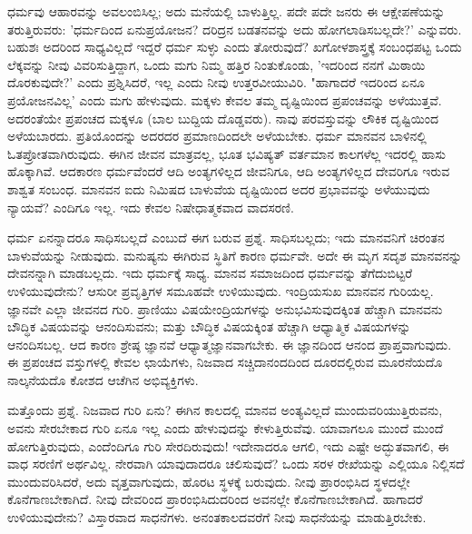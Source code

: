 ಧರ್ಮವು ಆಹಾರವನ್ನು ಅವಲಂಬಿಸಿಲ್ಲ; ಅದು ಮನೆಯಲ್ಲಿ ಬಾಳುತ್ತಿಲ್ಲ. ಪದೇ ಪದೇ ಜನರು ಈ ಆಕ್ಷೇಪಣೆಯನ್ನು ತರುತ್ತಿರುವರು: 'ಧರ್ಮದಿಂದ ಏನು\break ಪ್ರಯೋಜನ? ದರಿದ್ರನ ಬಡತನವನ್ನು ಅದು ಹೋಗಲಾಡಿಸಬಲ್ಲದೇ?' ಎನ್ನುವರು. ಬಹುಶಃ ಅದರಿಂದ ಸಾಧ್ಯವಿಲ್ಲದೆ ಇದ್ದರೆ ಧರ್ಮ ಸುಳ್ಳು ಎಂದು ತೋರುವುದೆ? ಖಗೋಳಶಾಸ್ತ್ರಕ್ಕೆ ಸಂಬಂಧಪಟ್ಟ ಒಂದು ಲೆಕ್ಕವನ್ನು ನೀವು ವಿವರಿಸುತ್ತಿದ್ದಾಗ, ಒಂದು ಮಗು ನಿಮ್ಮ ಹತ್ತಿರ ನಿಂತುಕೊಂಡು, 'ಇದರಿಂದ ನನಗೆ ಮಿಠಾಯಿ ದೊರಕುವುದೇ?' ಎಂದು ಪ್ರಶ್ನಿಸಿದರೆ, ಇಲ್ಲ ಎಂದು ನೀವು ಉತ್ತರವೀಯುವಿರಿ. "ಹಾಗಾದರೆ ಇದರಿಂದ ಏನೂ ಪ್ರಯೋಜನವಿಲ್ಲ' ಎಂದು ಮಗು ಹೇಳುವುದು. ಮಕ್ಕಳು ಕೇವಲ ತಮ್ಮ ದೃಷ್ಟಿಯಿಂದ ಪ್ರಪಂಚವನ್ನು ಅಳೆಯುತ್ತವೆ. ಅದರಂತೆಯೇ ಪ್ರಪಂಚದ ಮಕ್ಕಳೂ (ಬಾಲ ಬುದ್ದಿಯ ದೊಡ್ಡವರು). ನಾವು ಪರವಸ್ತುವನ್ನು ಲೌಕಿಕ ದೃಷ್ಟಿಯಿಂದ ಅಳೆಯಬಾರದು. ಪ್ರತಿಯೊಂದನ್ನು ಅದರದರ ಪ್ರಮಾಣದಿಂದಲೇ ಅಳೆಯಬೇಕು. ಧರ್ಮ ಮಾನವನ ಬಾಳಿನಲ್ಲಿ ಓತಪ್ರೋತವಾಗಿರುವುದು. ಈಗಿನ ಜೀವನ ಮಾತ್ರವಲ್ಲ, ಭೂತ ಭವಿಷ್ಯತ್ ವರ್ತಮಾನ ಕಾಲಗಳೆಲ್ಲ ಇದರಲ್ಲಿ ಹಾಸು ಹೊಕ್ಕಾಗಿವೆ. ಆದಕಾರಣ ಧರ್ಮವೆಂದರೆ ಆದಿ ಅಂತ್ಯಗಳಿಲ್ಲದ ಜೀವನಿಗೂ, ಆದಿ ಅಂತ್ಯಗಳಿಲ್ಲದ ದೇವರಿಗೂ ಇರುವ ಶಾಶ್ವತ ಸಂಬಂಧ. ಮಾನವನ ಐದು ನಿಮಿಷದ ಬಾಳುವೆಯ ದೃಷ್ಟಿಯಿಂದ ಅದರ ಪ್ರಭಾವವನ್ನು ಅಳೆಯುವುದು ನ್ಯಾಯವೆ? ಎಂದಿಗೂ ಇಲ್ಲ. ಇದು ಕೇವಲ ನಿಷೇಧಾತ್ಮಕವಾದ ವಾದಸರಣಿ.

ಧರ್ಮ ಏನನ್ನಾದರೂ ಸಾಧಿಸಬಲ್ಲದೆ ಎಂಬುದೆ ಈಗ ಬರುವ ಪ್ರಶ್ನೆ. ಸಾಧಿಸಬಲ್ಲದು; ಇದು ಮಾನವನಿಗೆ ಚಿರಂತನ ಬಾಳುವೆಯನ್ನು ನೀಡುವುದು. ಮನುಷ್ಯನು ಈಗಿರುವ ಸ್ಥಿತಿಗೆ ಕಾರಣ ಧರ್ಮವೇ. ಅದೇ ಈ ಮೃಗ ಸದೃಶ ಮಾನವನನ್ನು ದೇವನನ್ನಾಗಿ ಮಾಡಬಲ್ಲದು. ಇದು ಧರ್ಮಕ್ಕೆ ಸಾಧ್ಯ. ಮಾನವ ಸಮಾಜದಿಂದ ಧರ್ಮವನ್ನು ತೆಗೆದುಬಿಟ್ಟರೆ ಉಳಿಯುವುದೇನು? ಆಸುರೀ ಪ್ರವೃತ್ತಿಗಳ ಸಮೂಹವೇ ಉಳಿಯುವುದು. ಇಂದ್ರಿಯಸುಖ ಮಾನವನ ಗುರಿಯಲ್ಲ. ಜ್ಞಾನವೇ ಎಲ್ಲಾ ಜೀವನದ ಗುರಿ. ಪ್ರಾಣಿಯು ವಿಷಯೇಂದ್ರಿಯಗಳನ್ನು ಅನುಭವಿಸುವುದಕ್ಕಿಂತ ಹೆಚ್ಚಾಗಿ ಮಾನವನು ಬೌದ್ಧಿಕ ವಿಷಯವನ್ನು ಆನಂದಿಸುವನು; ಮತ್ತು ಬೌದ್ಧಿಕ ವಿಷಯಕ್ಕಿಂತ ಹೆಚ್ಚಾಗಿ ಆಧ್ಯಾತ್ಮಿಕ ವಿಷಯಗಳನ್ನು ಆನಂದಿಸಬಲ್ಲ. ಆದ ಕಾರಣ ಶ್ರೇಷ್ಠ ಜ್ಞಾನವೆ ಆಧ್ಯಾತ್ಮಜ್ಞಾನವಾಗಬೇಕು. ಈ ಜ್ಞಾನದಿಂದ ಆನಂದ ಪ್ರಾಪ್ತವಾಗುವುದು. ಈ ಪ್ರಪಂಚದ ವಸ್ತುಗಳಲ್ಲಿ ಕೇವಲ ಛಾಯೆಗಳು, ನಿಜವಾದ ಸಚ್ಚಿದಾನಂದದಿಂದ ದೂರದಲ್ಲಿರುವ ಮೂರನೆಯದೊ ನಾಲ್ಕನೆಯದೊ ಕೋಶದ ಆಚೆಗಿನ ಅಭಿವ್ಯಕ್ತಿಗಳು.

ಮತ್ತೊಂದು ಪ್ರಶ್ನೆ. ನಿಜವಾದ ಗುರಿ ಏನು? ಈಗಿನ ಕಾಲದಲ್ಲಿ ಮಾನವ ಅಂತ್ಯವಿಲ್ಲದೆ ಮುಂದುವರಿಯುತ್ತಿರುವನು, ಅವನು ಸೇರಬೇಕಾದ ಗುರಿ ಏನೂ ಇಲ್ಲ ಎಂದು ಹೇಳುವುದನ್ನು ಕೇಳುತ್ತಿರುವೆವು. ಯಾವಾಗಲೂ ಮುಂದೆ ಮುಂದೆ ಹೋಗುತ್ತಿರುವುದು, ಎಂದೆಂದಿಗೂ ಗುರಿ ಸೇರದಿರುವುದು! ಇದೇನಾದರೂ ಆಗಲಿ, ಇದು ಎಷ್ಟೇ ಅದ್ಭುತವಾಗಲಿ, ಈ ವಾಧ ಸರಣಿಗೆ ಅರ್ಥವಿಲ್ಲ. ನೇರವಾಗಿ ಯಾವುದಾದರೂ ಚಲಿಸುವುದೆ? ಒಂದು ಸರಳ ರೇಖೆಯನ್ನು ಎಲ್ಲಿಯೂ ನಿಲ್ಲಿಸದೆ ಮುಂದುವರಿಸಿದರೆ, ಅದು ವೃತ್ತವಾಗುವುದು, ಹೊರಟ ಸ್ಥಳಕ್ಕೆ ಬರುವುದು. ನೀವು ಪ್ರಾರಂಭಿಸಿದ ಸ್ಥಳದಲ್ಲೇ ಕೊನೆಗಾಣಬೇಕಾಗಿದೆ. ನೀವು ದೇವರಿಂದ ಪ್ರಾರಂಭಿಸಿದುದರಿಂದ ಅವನಲ್ಲೇ ಕೊನೆಗಾಣಬೇಕಾಗಿದೆ. ಹಾಗಾದರೆ ಉಳಿಯುವುದೇನು? ವಿಸ್ತಾರವಾದ ಸಾಧನೆಗಳು. ಅನಂತಕಾಲದವರೆಗೆ ನೀವು ಸಾಧನೆಯನ್ನು ಮಾಡುತ್ತಿರಬೇಕು.

